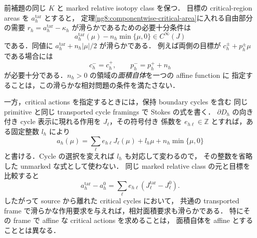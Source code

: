 \begin{proposition}
\label{ng8:source-corrected-area-demand}
前補題の同じ $K$ と marked relative isotopy class を保つ．
目標の critical-region areas を $a_h^{\mathrm{tar}}$ とすると，
定理\ref{ng8:componentwise-critical-area}に入れる自由部分の需要
$r_h=a_h^{\mathrm{tar}}-\kappa_h$ が滑らかであるための必要十分条件は
\begin{equation}\label{ng8:eq:source-target-wall-condition}
 a_h^{\mathrm{tar}}(\mu)-n_h\min\{\mu,0\}\in C^\infty(J)
\end{equation}
である．同値に $a_h^{\mathrm{tar}}+n_h|\mu|/2$ が滑らかである．
例えば両側の目標が $c_h^\pm+p_h^\pm\mu$ である場合には
\[
 c_h^-=c_h^+,
 \qquad p_h^-=p_h^++n_h
\]
が必要十分である．$n_h>0$ の領域の\emph{面積自体}を一つの affine function に
指定することは，この滑らかな相対問題の条件を満たさない．

一方，critical actions を指定するときには，保持 boundary cycles を含む
同じ primitive と同じ transported cycle framings で Stokes の式を書く．
$\partial D_h$ の向き付き cycle 表示に現れる作用を $J_\ell$，その符号付き
係数を $e_{h\ell}\in\mathbb Z$ とすれば，ある固定整数 $l_h$ により
\begin{equation}\label{ng8:eq:source-boundary-stokes}
 a_h(\mu)=\sum_\ell e_{h\ell}J_\ell(\mu)+l_h\mu
                       +n_h\min\{\mu,0\}
\end{equation}
と書ける．Cycle の選択を変えれば $l_h$ も対応して変わるので，
その整数を省略した unmarked な式として使わない．
同じ marked relative class の元と目標を比較すると
\begin{equation}\label{ng8:eq:source-relative-actions}
 a_h^{\mathrm{tar}}-a_h^0
 =\sum_\ell e_{h\ell}(J_\ell^{\mathrm{tar}}-J_\ell^0).
\end{equation}
したがって source から離れた critical cycles において，
共通の transported frame で滑らかな作用要求を与えれば，相対面積要求も滑らかである．
特にその frame で affine な critical actions を求めることは，
面積自体を affine とすることとは異なる．
\end{proposition}

